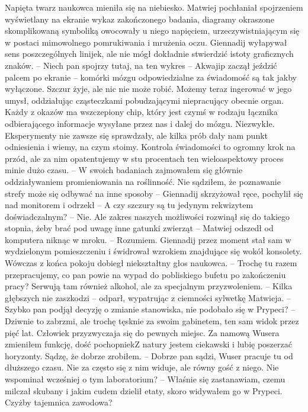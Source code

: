 \documentclass[../MAIN.tex]{subfiles}
\begin{document}
Napięta twarz naukowca mieniła się na niebiesko. Matwiej pochłaniał spojrzeniem wyświetlany na ekranie wykaz zakończonego badania, diagramy okraszone skomplikowaną symboliką owocowały u niego napięciem, urzeczywistniającym się w postaci mimowolnego pomrukiwania i mrużenia oczu. Giennadij wyłapywał sens poszczególnych linijek, ale nie mógł dokładnie stwierdzić istoty graficznych znaków. 
-- Niech pan spojrzy tutaj, na ten wykres -- Akwajip zaczął jeździć palcem po ekranie -- komórki mózgu odpowiedzialne za świadomość są tak jakby wyłączone. Szczur żyje, ale nic nie może robić. Możemy teraz ingerować w jego umysł, oddziałując cząsteczkami pobudzającymi niepracujący obecnie organ. Każdy z okazów ma wszczepiony chip, który jest czymś w rodzaju łącznika odbierającego informacje wysyłane przez nas i dalej do mózgu. Niezwykłe. Eksperymenty nie zawsze się sprawdzały, ale kilka prób dały nam punkt odniesienia i wiemy, na czym stoimy. Kontrola świadomości to ogromny krok na przód, ale za nim opatentujemy w stu procentach ten wieloaspektowy proces minie dużo czasu. 
-- W swoich badaniach zajmowałem się głównie oddziaływaniem promieniowania na roślinność. Nie sądziłem, że poznawanie strefy może się odbywać na inne sposoby -- Giennadij skrzyżował ręce, pochylił się nad monitorem i odrzekł -- A czy szczury są tu jedynym rekwizytem doświadczalnym? 
-- Nie. Ale zakres naszych możliwości rozwinął się do takiego stopnia, żeby brać pod uwagę inne gatunki zwierząt -- Matwiej odszedł od komputera niknąc w mroku. 
-- Rozumiem. 
Giennadij przez moment stał sam w wydzielonym pomieszczeniu i świdrował wzrokiem znajdujące się wokół konsolety. Wówczas z końca pokoju dobiegł niekształtny głos naukowca. 
-- Trochę tu razem przepracujemy, co pan powie na wypad do pobliskiego bufetu po zakończeniu pracy? Serwują tam również alkohol, ale za specjalnym przyzwoleniem. 
-- Kilka głębszych nie zaszkodzi -- odparł, wypatrując z ciemności sylwetkę Matwieja. 
-- Szybko pan podjął decyzję o zmianie stanowiska, nie podobało się w Prypeci? 
-- Dziwnie to zabrzmi, ale trochę tęsknie za swoim gabinetem, ten sam widok przez pięć lat. Człowiek przyzwyczaja się do pewnych miejsc. Za namową Wusera zmieniłem funkcję, dość pochopnie\3kZ natury jestem ciekawski i lubię poszerzać horyzonty. Sądzę, że dobrze zrobiłem. 
-- Dobrze pan sądzi, Wuser pracuje tu od dłuższego czasu. Nie za często się z nim widuje, ale równy gość z niego. Nie wspominał wcześniej o tym laboratorium? 
-- Właśnie się zastanawiam, czemu milczał skubany i jakim cudem dzielił etaty, skoro widywałem go w Prypeci. Czyżby tajemnica zawodowa? 
\end{document}
